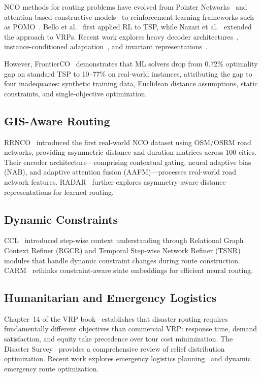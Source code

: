\documentclass[12pt,a4paper]{article}
\begin{document}
NCO methods for routing problems have evolved from Pointer
Networks~\cite{ptrnets2015} and attention-based constructive
models~\cite{am2019} to reinforcement learning frameworks such as
POMO~\cite{pomo2020}. Bello et al.~\cite{ncorl2016} first applied RL to TSP,
while Nazari et al.~\cite{rlvrp2018} extended the approach to VRPs. Recent work
explores heavy decoder architectures~\cite{relight2025}, instance-conditioned
adaptation~\cite{glop2024}, and invariant representations~\cite{invit2024}.

However, FrontierCO~\cite{frontierco2026} demonstrates that ML solvers drop
from 0.72\% optimality gap on standard TSP to 10--77\% on real-world instances,
attributing the gap to four inadequacies: synthetic training data, Euclidean
distance assumptions, static constraints, and single-objective optimization.

\subsection{GIS-Aware Routing}

RRNCO~\cite{rrnco2026} introduced the first real-world NCO dataset using
OSM/OSRM road networks, providing asymmetric distance and duration matrices
across 100 cities. Their encoder architecture---comprising contextual gating,
neural adaptive bias (NAB), and adaptive attention fusion (AAFM)---processes
real-world road network features. RADAR~\cite{radar2026} further explores
asymmetry-aware distance representations for learned routing.

\subsection{Dynamic Constraints}

CCL~\cite{ccl2026} introduced step-wise context understanding through
Relational Graph Context Refiner (RGCR) and Temporal Step-wise Network Refiner
(TSNR) modules that handle dynamic constraint changes during route
construction. CARM~\cite{carm2026} rethinks constraint-aware state embeddings
for efficient neural routing.

\subsection{Humanitarian and Emergency Logistics}

Chapter~14 of the VRP book~\cite{vrpbook} establishes that disaster routing
requires fundamentally different objectives than commercial VRP: response time,
demand satisfaction, and equity take precedence over tour cost minimization.
The Disaster Survey~\cite{disaster2025} provides a comprehensive review of
relief distribution optimization. Recent work explores emergency logistics
planning~\cite{emergency2026} and dynamic emergency route optimization.
\end{document}
